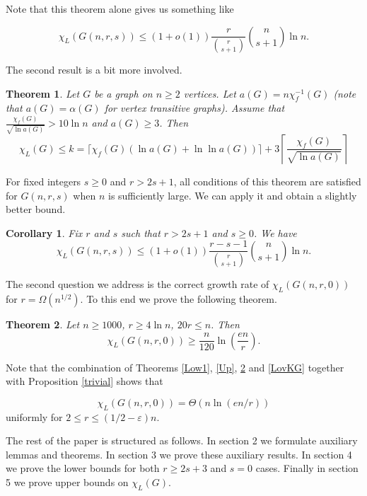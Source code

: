 \documentclass[10pt,a4paper]{article}
\newtheorem{theorem}{Theorem}
\newtheorem{corollary}{Corollary}[section]
\theoremstyle{remark}
\theoremstyle{definition}
\newcommand{\skob}[1]{\left(#1\right)}
\begin{document}
Note that this theorem alone gives us something like 

$$
    \chi_L(G(n,r,s)) \leq (1+o(1))\frac{r}{\binom{r}{s+1}}\binom{n}{s+1}\ln n.
$$

The second result is a bit more involved.

\begin{theorem}
    \label{UB2}
    Let $G$ be a graph on $n \geq 2$ vertices. Let $a(G) = n\chi^{-1}_f(G)$ (note that $a(G) = \alpha(G)$ for vertex transitive graphs). Assume that $\frac{\chi_f(G)}{\sqrt{\ln a(G)}} > 10\ln n$ and $a(G) \geq 3$. Then
    $$
        \chi_L(G) \leq k = \lceil\chi_f(G)\skob{\ln a(G) + \ln \ln a(G)}\rceil + 3\left\lceil\frac{\chi_f(G)}{\sqrt{\ln a(G)}}\right\rceil
    $$
\end{theorem}

For fixed integers $s \geq 0$ and $r > 2s+1$, all conditions of this theorem are satisfied for $G(n,r,s)$ when $n$ is sufficiently large. We can apply it and obtain a slightly better bound.

\begin{corollary}    
    Fix $r$ and $s$ such that $r > 2s+1$ and $s \geq 0$. We have 
    $$
        \chi_L(G(n,r,s)) \leq (1+o(1))\frac{r-s-1}{\binom{r}{s+1}}\binom{n}{s+1}\ln n.
    $$
\end{corollary}


The second question we address is the correct growth rate of $\chi_L(G(n,r,0))$ for $r = \Omega(n^{1/2})$. To this end we prove the following theorem.

\begin{theorem}
    \label{main_kgnr}
	Let $n \geq 1000$, $r \geq 4\ln n$, $20r \leq n$. Then
	$$
		\chi_L(G(n,r,0)) \geq \frac{n}{120}\ln\skob{\frac{en}{r}}.
	$$
\end{theorem}

Note that the combination of Theorems \ref{Low1}, \ref{Up}, \ref{main_kgnr} and \ref{LovKG} together with Proposition \ref{trivial} shows that 

$$ 
    \chi_L(G(n,r,0)) = \Theta\skob{n\ln\skob{en/r}}
$$
uniformly for $2 \leq r \leq (1/2 - \varepsilon)n$.

The rest of the paper is structured as follows. In section 2 we formulate auxiliary lemmas and theorems. In section 3 we prove these auxiliary results. In section 4 we prove the lower bounds for both $r \geq 2s+3$ and $s = 0$ cases. Finally in section 5 we prove upper bounds on $\chi_L(G)$.


\end{document}
